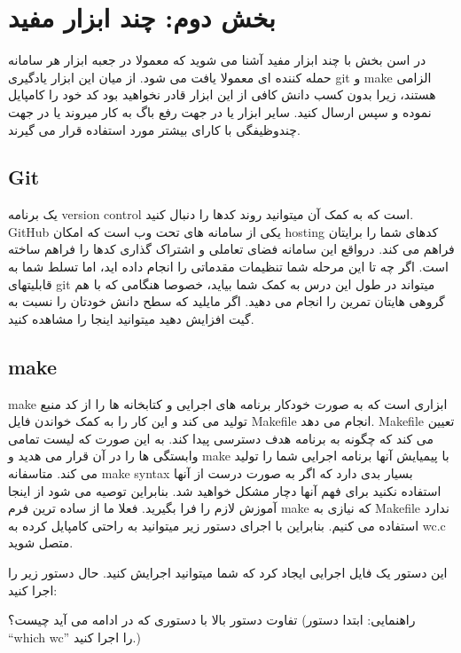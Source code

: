 \newpage
\section
{
\textbf{ {\Large 
بخش دوم: چند ابزار مفید
}}}
در اسن بخش با چند ابزار مفید آشنا می شوید که معمولا در جعبه ابزار هر سامانه حمله کننده ای معمولا یافت می شود. از میان این ابزار یادگیری git و make الزامی هستند، زیرا بدون کسب دانش کافی از این ابزار قادر نخواهید بود کد خود را کامپایل نموده و سپس ارسال کنید. سایر ابزار یا در جهت رفع باگ به کار میروند یا در جهت چندوظیفگی با کارای بیشتر مورد استفاده قرار می گیرند.

\subsection{Git}
یک برنامه version control است که به کمک آن میتوانید روند کدها را دنبال کنید. GitHub یکی از سامانه های تحت وب است که امکان hosting کدهای شما را برایتان فراهم می کند. درواقع این سامانه فضای تعاملی و اشتراک گذاری کدها را فراهم ساخته است.
اگر چه تا این مرحله شما تنظیمات مقدماتی را انجام داده اید، اما تسلط شما به قابلیتهای git میتواند در طول این درس به کمک شما بیاید، خصوصا هنگامی که با هم گروهی هایتان تمرین را انجام می دهید.
اگر مایلید که سطح دانش خودتان را نسبت به گیت افزایش دهید میتوانید اینجا را مشاهده کنید.

\subsection{make}
make ابزاری است که به صورت خودکار برنامه های اجرایی و کتابخانه ها را از کد منبع تولید می کند و این کار را به کمک خواندن فایل Makefile انجام می دهد. Makefile تعیین می کند که چگونه به برنامه هدف دسترسی پیدا کند. به این صورت که لیست تمامی وابستگی ها را در آن قرار می هدید و make با پیمیایش آنها برنامه اجرایی شما را تولید می کند.
متاسفانه make syntax بسیار بدی دارد که اگر به صورت درست از آنها استفاده نکنید برای فهم آنها دچار مشکل خواهید شد.
بنابراین توصیه می شود از اینجا آموزش لازم را فرا بگیرید.
فعلا ما از ساده ترین فرم make که نیازی به Makefile ندارد استفاده می کنیم. بنابراین با اجرای دستور زیر میتوانید به راحتی کامپایل کرده به wc.c متصل شوید.\begin{flushleft}
\end{flushleft}
این دستور یک فایل اجرایی ایجاد کرد که شما میتوانید اجرایش کنید. حال دستور زیر را اجرا کنید:
\begin{flushleft}
\end{flushleft}
تفاوت دستور بالا با دستوری که در ادامه می آید چیست؟ (راهنمایی: ابتدا دستور “which wc” را اجرا کنید.)
\begin{flushleft}
\end{flushleft}

